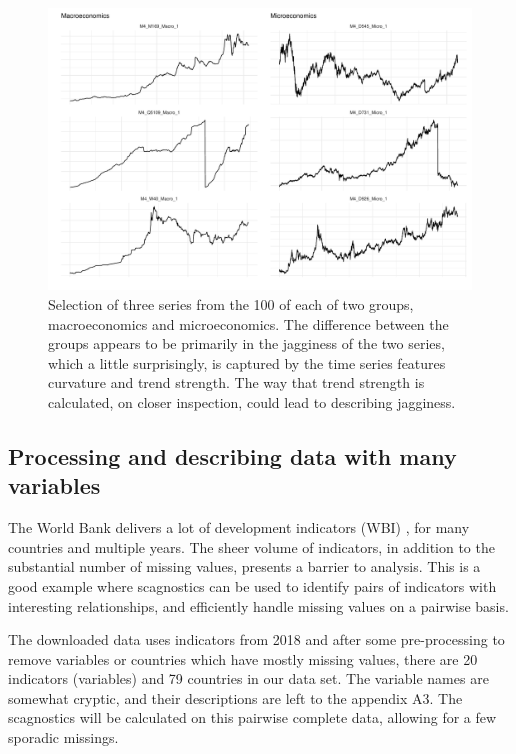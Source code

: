 \begin{Schunk}
\begin{figure}
\includegraphics[width=1\linewidth]{mason-lee-laa-cook_files/figure-latex/tsplots-1} \caption[Selection of three series from the 100 of each of two groups, macroeconomics and microeconomics]{Selection of three series from the 100 of each of two groups, macroeconomics and microeconomics. The difference between the groups appears to be primarily in the jagginess of the two series, which a little surprisingly, is captured by the time series features curvature and trend strength. The way that trend strength is calculated, on closer inspection, could lead to describing jagginess.}\label{fig:tsplots}
\end{figure}
\end{Schunk}

\hypertarget{processing-and-describing-data-with-many-variables}{%
\subsection{Processing and describing data with many
variables}\label{processing-and-describing-data-with-many-variables}}

The World Bank delivers a lot of development indicators (WBI)
\citep{WBI}, for many countries and multiple years. The sheer volume of
indicators, in addition to the substantial number of missing values,
presents a barrier to analysis. This is a good example where scagnostics
can be used to identify pairs of indicators with interesting
relationships, and efficiently handle missing values on a pairwise
basis.

The downloaded data uses indicators from 2018 and after some
pre-processing to remove variables or countries which have mostly
missing values, there are 20 indicators (variables) and 79 countries in
our data set. The variable names are somewhat cryptic, and their
descriptions are left to the appendix A3. The scagnostics will be
calculated on this pairwise complete data, allowing for a few sporadic
missings.

